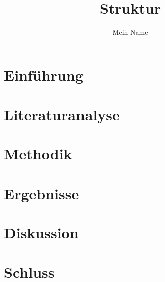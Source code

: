 \documentclass[twocolumn,a4paper]{article}
\title{Struktur}
\author{Mein Name}
\begin{document}
\maketitle

\tableofcontents


\section{Einführung}
\lipsum[1-3]

\section{Literaturanalyse}
\lipsum[4-6]

\section{Methodik}
\lipsum[7-9]

\section{Ergebnisse}
\lipsum[1-3]

\section{Diskussion}
\lipsum[4-6]

\section{Schluss}
\lipsum[7-8]
\end{document}
